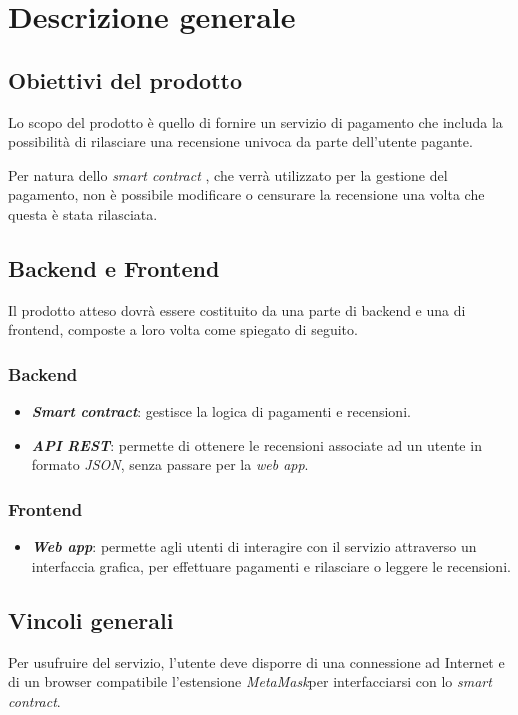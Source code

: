 \section{Descrizione generale}

    \subsection{Obiettivi del prodotto}
    Lo scopo del prodotto è quello di fornire un servizio di pagamento che includa la possibilità di rilasciare una recensione univoca da parte dell'utente pagante.

    Per natura dello \textit{smart contract} \glo \:, che verrà utilizzato per la gestione del pagamento, non è possibile modificare o censurare la recensione una volta che questa è stata rilasciata.

    \subsection{Backend e Frontend}
    Il prodotto atteso dovrà essere costituito da una parte di backend e una di frontend, composte a loro volta come spiegato di seguito.

        \subsubsection{Backend}
        \begin{itemize}
            \item \textit{\textbf{Smart contract}}: gestisce la logica di pagamenti e recensioni.
            \item \textit{\textbf{API REST}}\glo : permette di ottenere le recensioni associate ad un utente in formato \textit{JSON}\glo , senza passare per la \textit{web app}.
        \end{itemize}

        \subsubsection{Frontend}
        \begin{itemize}
            \item \textit{\textbf{Web app}}: permette agli utenti di interagire con il servizio attraverso un interfaccia grafica, per effettuare pagamenti e rilasciare o leggere le recensioni.
        \end{itemize}
    \subsection{Vincoli generali}
    Per usufruire del servizio, l'utente deve disporre di una connessione ad Internet e di un browser compatibile l'estensione \textit{MetaMask}\glo  per interfacciarsi con lo \textit{smart contract}.